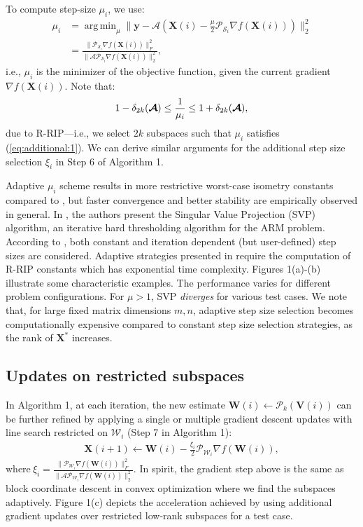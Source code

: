 \documentclass[twocolumn]{svjour3}
\newcommand{\vectornorm}[1]{\|#1\|}
\newcommand{\vectornormbig}[1]{\big\|#1\big\|}
\newcommand{\obs}{\boldsymbol{y}}
\newcommand{\sensing}{\boldsymbol{\mathcal{A}}}
\newcommand{\signal}{\boldsymbol{X}}
\newcommand{\bestsignal}{\boldsymbol{X}^\ast}
\newcommand{\rank}{k}
\DeclareMathOperator*{\argmin}{arg\,min}
\begin{document}
To compute step-size $ \mu_i $, we use:
\begin{align}
\mu_i &= \argmin_\mu \vectornormbig{\obs - \sensing \left(\signal(i)  - \frac{\mu}{2} \mathcal{P}_{\mathcal{S}_i}\nabla f(\signal(i))\right)}_2^2 \nonumber \\ &= \frac{\| \mathcal{P}_{\mathcal{S}_i}\nabla f(\signal(i))\|_F^2}{\|\sensing\mathcal{P}_{\mathcal{S}_i}\nabla f(\signal(i))\|_2^2}, \label{eq:step}
\end{align} i.e., $ \mu_i $ is the minimizer of the objective function, given the current gradient $\nabla f(\signal(i))$. 
Note that:
\begin{align}{\label{eq:additional:1}}
1-\delta_{2\rank}(\sensing)\le \frac{1}{\mu_i} \le 1+\delta_{2\rank}(\sensing),
\end{align} due to R-RIP---i.e., we select $ 2\rank $ subspaces such that $ \mu_i $ satisfies (\ref{eq:additional:1}). We can derive similar arguments for the additional step size selection $ \xi_i $ in Step 6 of Algorithm 1. 

Adaptive $ \mu_i $ scheme results in more restrictive worst-case isometry constants compared to \cite{HTP, foucart2010sparse, SVP}, but faster convergence and better stability are empirically observed in general. In \cite{SVP}, the authors present the Singular Value Projection (SVP) algorithm, an iterative hard thresholding algorithm for the ARM problem. According to \cite{SVP}, both constant and iteration dependent (but user-defined) step sizes are considered. Adaptive strategies presented in \cite{SVP} require the computation of R-RIP constants which has exponential time complexity. Figures 1(a)-(b) illustrate some characteristic examples. The performance varies for different problem configurations. For $\mu > 1$, SVP {\it diverges} for various test cases. We note that, for large fixed matrix dimensions $m, n$, adaptive step size selection becomes computationally expensive compared to constant step size selection strategies, as the rank of $\bestsignal$ increases.

\subsection{Updates on restricted subspaces}

In Algorithm 1, at each iteration, the new estimate $ \boldsymbol{W}(i) \leftarrow \mathcal{P}_{\rank}\left(\boldsymbol{V}(i)\right) $ can be further refined by applying a single or multiple gradient descent updates with line search restricted on $ \mathcal{W}_{i} $ \cite{HTP} (Step 7 in Algorithm 1): 
\begin{align}
\signal(i+1) \leftarrow \boldsymbol{W}(i) - \frac{\xi_i}{2} \mathcal{P}_{\mathcal{W}_i} \nabla f(\boldsymbol{W}(i)),  \nonumber
\end{align} $\text{where}~ \xi_i = \frac{\vectornorm{\mathcal{P}_{\mathcal{W}_i} \nabla f(\boldsymbol{W}(i))}_F^2}{\vectornorm{\sensing \mathcal{P}_{\mathcal{W}_i} \nabla f(\boldsymbol{W}(i))}_2^2}. $ In spirit, the gradient step above is the same as block coordinate descent in convex optimization where we find the subspaces adaptively. Figure 1(c) depicts the acceleration achieved by using additional gradient updates over restricted low-rank subspaces for a test case.
\end{document}

